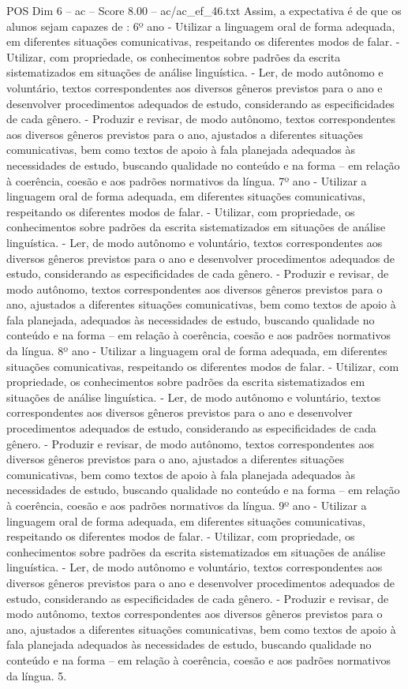 \begin{textsample}{POS Dim 6 – ac – Score 8.00 – ac/ac\_ef\_46.txt}
Assim, a expectativa é de que os alunos sejam capazes de : 6º ano - Utilizar a linguagem oral de forma adequada, em diferentes situações comunicativas, respeitando os diferentes modos de falar. - Utilizar, com propriedade, os conhecimentos sobre padrões da escrita sistematizados em situações de análise linguística. - Ler, de modo autônomo e voluntário, textos correspondentes aos diversos gêneros previstos para o ano e desenvolver procedimentos adequados de estudo, considerando as especificidades de cada gênero. - Produzir e revisar, de modo autônomo, textos correspondentes aos diversos gêneros previstos para o ano, ajustados a diferentes situações comunicativas, bem como textos de apoio à fala planejada adequados às necessidades de estudo, buscando qualidade no conteúdo e na forma – em relação à coerência, coesão e aos padrões normativos da língua. 7º ano - Utilizar a linguagem oral de forma adequada, em diferentes situações comunicativas, respeitando os diferentes modos de falar. - Utilizar, com propriedade, os conhecimentos sobre padrões da escrita sistematizados em situações de análise linguística. - Ler, de modo autônomo e voluntário, textos correspondentes aos diversos gêneros previstos para o ano e desenvolver procedimentos adequados de estudo, considerando as especificidades de cada gênero. - Produzir e revisar, de modo autônomo, textos correspondentes aos diversos gêneros previstos para o ano, ajustados a diferentes situações comunicativas, bem como textos de apoio à fala planejada, adequados às necessidades de estudo, buscando qualidade no conteúdo e na forma – em relação à coerência, coesão e aos padrões normativos da língua. 8º ano - Utilizar a linguagem oral de forma adequada, em diferentes situações comunicativas, respeitando os diferentes modos de falar. - Utilizar, com propriedade, os conhecimentos sobre padrões da escrita sistematizados em situações de análise linguística. - Ler, de modo autônomo e voluntário, textos correspondentes aos diversos gêneros previstos para o ano e desenvolver procedimentos adequados de estudo, considerando as especificidades de cada gênero. - Produzir e revisar, de modo autônomo, textos correspondentes aos diversos gêneros previstos para o ano, ajustados a diferentes situações comunicativas, bem como textos de apoio à fala planejada adequados às necessidades de estudo, buscando qualidade no conteúdo e na forma – em relação à coerência, coesão e aos padrões normativos da língua. 9º ano - Utilizar a linguagem oral de forma adequada, em diferentes situações comunicativas, respeitando os diferentes modos de falar. - Utilizar, com propriedade, os conhecimentos sobre padrões da escrita sistematizados em situações de análise linguística. - Ler, de modo autônomo e voluntário, textos correspondentes aos diversos gêneros previstos para o ano e desenvolver procedimentos adequados de estudo, considerando as especificidades de cada gênero. - Produzir e revisar, de modo autônomo, textos correspondentes aos diversos gêneros previstos para o ano, ajustados a diferentes situações comunicativas, bem como textos de apoio à fala planejada adequados às necessidades de estudo, buscando qualidade no conteúdo e na forma – em relação à coerência, coesão e aos padrões normativos da língua. 5.

\end{textsample}
